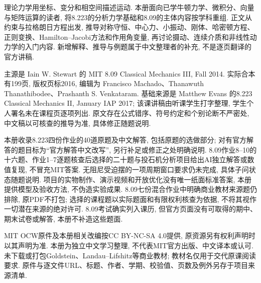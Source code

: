 \originalpreface
理论力学用坐标、变分和相空间描述运动. 本册面向已学牛顿力学、微积分、向量与矩阵运算的读者, 将8.223的分析力学基础和8.09的主体内容按学科重组. 正文从约束与拉格朗日方程出发, 推导对称守恒、中心力、小振动、刚体、哈密顿方程、正则变换、Hamilton--Jacobi方法和作用角变量, 再讨论摄动、连续介质和非线性动力学的入门内容. 新增解释、推导与例题属于中文整理者的补充, 不是逐页翻译的官方讲稿.

主源是 Iain W. Stewart 的 MIT 8.09 Classical Mechanics III, Fall 2014. 实际合本有199页, 版权页标2016, 编辑为 Francisco Machado、Thanawuth Thanathibodee、Prashanth S. Venkataram. 基础来源是 Matthew Evans 的8.223 Classical Mechanics II, January IAP 2017; 该课讲稿由听课学生打字整理, 学生个人署名未在课程页逐项列出. 原文存在公式错序、符号约定和个别论断不严密处, 中文稿以可核查的推导为准, 具体修正随题说明.

本册收录8.223四份作业的40道原题及中文解答, 包括原题的选做部分; 对有官方解答的题目标为“官方解答中文改写”, 另行补足或修正之处明确说明. 8.09作业8--10的十六题、作业1--7逐题核查后选择的二十题与投石机分析项目给出AI独立解答或数值复现, 不冒充MIT答案. 无阻尼受迫摆的一项周期窗口要求仍未完成, 具体子问状态随题说明. 项目的实物制作、演示视频和开放优化没有唯一纸面标准答案, 本册提供模型及验收方法, 不伪造实验成果. 8.09七份混合作业中明确商业教材来源题仍排除, 原PDF不打包; 选择的课程题以实际题面和有限权利核查为依据, 不将其视作一切潜在来源的绝对许可. 8.09考试确实列入课历, 但官方页面没有可取得的期中、期末试卷或解答, 本册不补造这些题面.

MIT OCW原件及本册相关改编按CC BY-NC-SA 4.0提供, 原资源另有权利声明时以其声明为准. 本册为独立中文学习整理, 不代表MIT官方出版、中文译本或认可. 未下载或打包Goldstein、Landau--Lifshitz等商业教材; 教材名仅用于交代原课阅读要求. 原件与逐文件URL、标题、作者、学期、校验值、页数及例外另存于项目来源清单.

